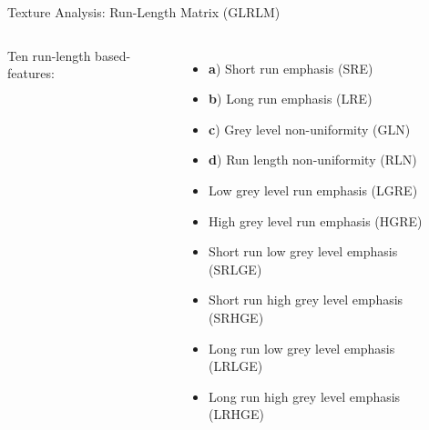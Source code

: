 \documentclass[10pt,aspectratio=169]{beamer}
\begin{document}
\begin{frame}{Texture Analysis: Run-Length Matrix (GLRLM)}
  \begin{columns}[onlytextwidth]
    Ten run-length based-features:
    \begin{itemize}
       \item \textbf{a}) Short run emphasis (SRE) 
       \item \textbf{b}) Long run emphasis (LRE) 
       \item \textbf{c}) Grey level non-uniformity (GLN) 
       \item \textbf{d}) Run length non-uniformity (RLN) 
       \item Low grey level run emphasis (LGRE)
       \item High grey level run emphasis (HGRE)
       \item Short run low grey level emphasis (SRLGE)
       \item Short run high grey level emphasis (SRHGE)
       \item Long run low grey level emphasis (LRLGE)
       \item Long run high grey level emphasis (LRHGE)
    \end{itemize}
    \begin{columns}
    \centering
    \centering
    \\
    \centering
    \\
    \end{columns}
  \end{columns}
\end{frame}
\end{document}
